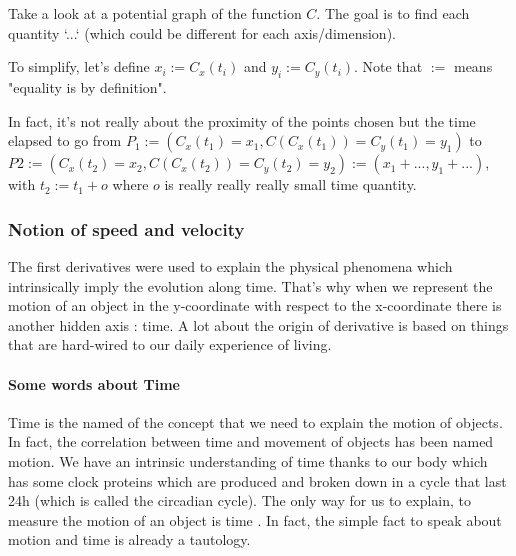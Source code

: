 \documentclass[12pt]{article}
\begin{document}
Take a look at a potential graph of the function $C$. The goal is to find each quantity `...` (which could be different for each axis/dimension).

\begin{figure}[H]
 \centering
 
\end{figure}

To simplify, let's define $x_i:=C_x(t_i)$ and $y_i:=C_y(t_i)$. Note that $:=$ means "equality is by definition".

In fact, it's not really about the proximity of the points chosen but the time elapsed to go from $P_1:=(C_x(t_1)=x_1, C(C_x(t_1))=C_y(t_1)=y_1)$ to $P2:=(C_x(t_2)=x_2, C(C_x(t_2))=C_y(t_2)=y_2) := (x_1+..., y_1+...)$, with $t_2 := t_1 + o$ where $o$ is really really really small time quantity. 

\subsubsection{Notion of speed and velocity}

The first derivatives were used to explain the physical phenomena which intrinsically imply the evolution along time. That's why when we represent the motion of an object in the y-coordinate with respect to the x-coordinate there is another hidden axis : time.
\newline
A lot about the origin of derivative is based on things that are hard-wired to our daily experience of living.


\paragraph{Some words about Time}


Time is the named of the concept that we need to explain the motion of objects. In fact, the correlation between time and movement of objects has been named motion.
We have an intrinsic understanding of time thanks to our body which has some clock proteins \cite{web_clock_proteins} which are  produced and broken down in a cycle that last 24h (which is called the circadian cycle). The only way for us to explain, to measure the motion of an object is time \cite{web_aristotle_motion_time}. In fact, the simple fact to speak about motion and time is already a tautology.
\end{document}
